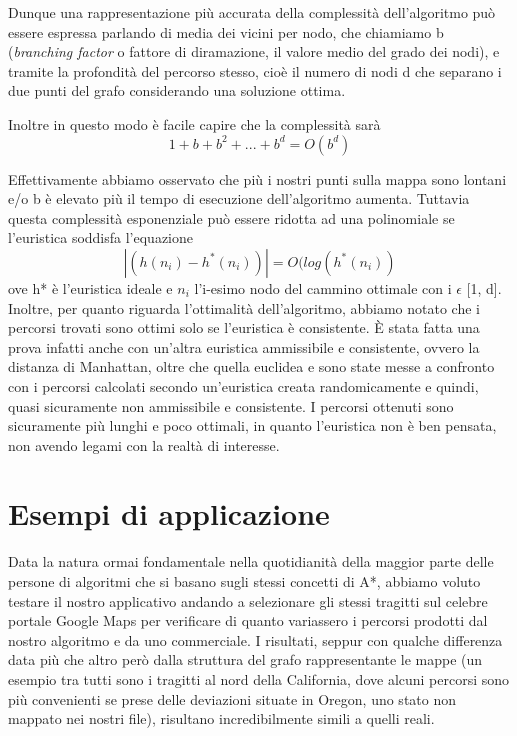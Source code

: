 \documentclass[12pt,a4paper]{report}
\begin{document}
Dunque una rappresentazione più accurata della complessità dell'algoritmo può essere espressa parlando di media dei vicini per nodo, che chiamiamo b (\emph{branching factor} o fattore di diramazione, il valore medio del grado dei nodi), e tramite la profondità del percorso stesso, cioè il numero di nodi d che separano i due punti del grafo considerando una soluzione ottima.

Inoltre in questo modo è facile capire che la complessità sarà \[1+b+b^2+...+b^d = O(b^{d})\]


Effettivamente abbiamo osservato che più i nostri punti sulla mappa sono lontani e/o b è elevato più il tempo di esecuzione dell'algoritmo aumenta.
Tuttavia questa complessità esponenziale può essere ridotta ad una polinomiale se l'euristica soddisfa l'equazione \[|(h(n_i)-h^*(n_i))| = O(log(h^*(n_i))\]
ove h* è l'euristica ideale e \(n_i\) l'i-esimo nodo del cammino ottimale con i \(\epsilon\) [1, d].
\\


Inoltre, per quanto riguarda l'ottimalità dell'algoritmo, abbiamo notato che i percorsi trovati sono ottimi solo se l'euristica è consistente. È stata fatta una prova infatti anche con un'altra euristica ammissibile e consistente, ovvero la distanza di Manhattan, oltre che quella euclidea e sono state messe a confronto con i percorsi calcolati secondo un'euristica creata randomicamente e quindi, quasi sicuramente non ammissibile e consistente.
I percorsi ottenuti sono sicuramente più lunghi e poco ottimali, in quanto l'euristica non è ben pensata, non avendo legami con la realtà di interesse. 

\chapter{Esempi di applicazione}

Data la natura ormai fondamentale nella quotidianità della maggior parte delle persone di algoritmi che si basano sugli stessi concetti di A*, abbiamo voluto testare il nostro applicativo andando a selezionare gli stessi tragitti sul celebre portale Google Maps per verificare di quanto variassero i percorsi prodotti dal nostro algoritmo e da uno commerciale. I risultati, seppur con qualche differenza data più che altro però dalla struttura del grafo rappresentante le mappe (un esempio tra tutti sono i tragitti al nord della California, dove alcuni percorsi sono più convenienti se prese delle deviazioni situate in Oregon, uno stato non mappato nei nostri file), risultano incredibilmente simili a quelli reali.
\end{document}
